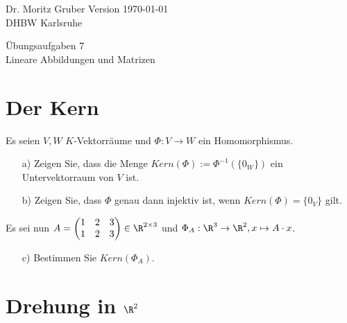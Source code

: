 




\vspace*{-20mm}
{
	\color{dhbwGray}
	Dr. Moritz Gruber	\hfill Version \today\\
	DHBW Karlsruhe\\
}

\vspace{10mm}
\begin{center}
	{
		\color{lightBlue}
		{ \LARGE 	\"Ubungsaufgaben 7}\\[3mm]
		{\Large Lineare Abbildungen und Matrizen}
	}
\end{center}

\vspace{5mm}




\section{Der Kern}
Es seien $V,W$ $K$-Vektorräume und $\Phi: V \to W$ ein Homomorphismus.
\begin{itemize}
\item[a)] Zeigen Sie, dass die Menge $Kern(\Phi):=\Phi^{-1}(\{0_W\})$ ein Untervektorraum von $V$ ist.
\item[b)] Zeigen Sie, dass $\Phi$ genau dann injektiv ist, wenn  $Kern(\Phi)=\{0_V\}$ gilt.
\end{itemize}
Es sei nun $A=\begin{pmatrix} 1&2&3 \\ 1&2&3 \end{pmatrix} \in \R^{2\times 3}$ und $\Phi_A: \R^3 \to \R^2, x \mapsto A \cdot x$.
\begin{itemize}
\item[c)] Bestimmen Sie $Kern(\Phi_A)$.
\end{itemize}

\section{Drehung in $\R^2$}

